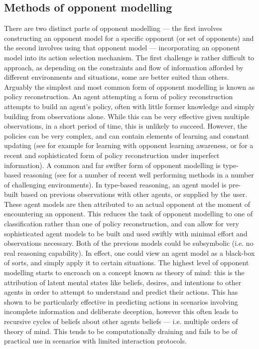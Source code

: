 \subsection{Methods of opponent modelling}
There are two distinct parts of opponent modelling --- the first involves constructing an opponent model for a specific opponent (or set of opponents) and the second involves using that opponent model --- incorporating an opponent model into its action selection mechanism. 
\newline \newline
The first challenge is rather difficult to approach, as depending on the constraints and flow of information afforded by different environments and situations, some are better suited than others. 
\newline \newline
Arguably the simplest and most common form of opponent modelling is known as policy reconstruction. An agent attempting a form of policy reconstruction attempts to build an agent's policy, often with little former knowledge and simply building from observations alone. While this can be very effective given multiple observations, in a short period of time, this is unlikely to succeed. However, the policies can be very complex, and can contain elements of learning and constant updating (see for example \cite{Leibo2017} for learning with opponent learning awareness, or \cite{mealing_shapiro_OM_by_expectation_maximisation} for a recent and sophisticated form of policy reconstruction under imperfect information). 
\newline \newline
A common and far swifter form of opponent modelling is type-based reasoning (see \cite{Evalulation_of_adhoc_teamwork_Barrett_Stone_Kraus} for a number of recent well performing methods in a number of challenging environments). In type-based reasoning, an agent model is pre-built based on previous observations with other agents, or supplied by the user. These agent models are then attributed to an actual opponent at the moment of encountering an opponent. This reduces the task of opponent modelling to one of classification rather than one of policy reconstruction, and can allow for very sophisticated agent models to be built and used swiftly with minimal effort and observations necessary. 
\newline \newline
Both of the previous models could be subsymbolic (i.e. no real reasoning capability). In effect, one could view an agent model as a black-box of sorts, and simply apply it to certain situations. The highest level of opponent modelling starts to encroach on a concept known as theory of mind: this is the attribution of latent mental states like beliefs, desires, and intentions to other agents in order to attempt to understand and predict their actions. This has shown to be particularly effective in predicting actions in scenarios involving incomplete information and deliberate deception, however this often leads to recursive cycles of beliefs about other agents beliefs --- i.e. multiple orders of theory of mind.  This tends to be computationally draining and fails to be of practical use in scenarios with limited interaction protocols. 
